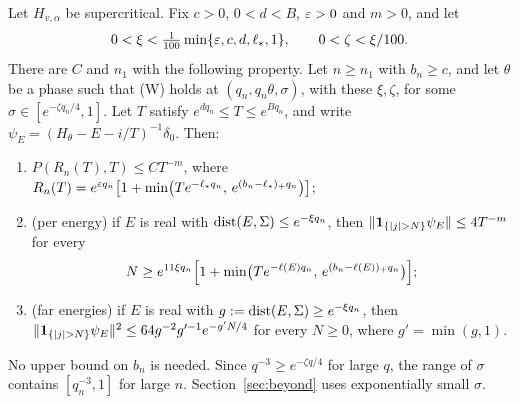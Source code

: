 \begin{theorem}\label{thm:tI-window}
Let $H_{v,\alpha}$ be supercritical. Fix $c>0$, $0<d<B$, $\varepsilon>0$ and $m>0$, and let
\[
0<\xi<\tfrac1{100}\min\{\varepsilon,c,d,\ell_*,1\},\qquad0<\zeta<\xi/100.
\]
There are $C$ and $n_1$ with the following property. Let $n\ge n_1$ with $b_n\ge c$, and let $\theta$ be a phase such that (W) holds at $(q_n,q_n\theta,\sigma)$, with these $\xi,\zeta$, for some $\sigma\in[e^{-\zeta q_n/4},1]$. Let $T$ satisfy $e^{dq_n}\le T\le e^{Bq_n}$, and write $\psi_E=(H_\theta-E-i/T)^{-1}\delta_0$. Then:
\begin{enumerate}
\item $P(R_n(T),T)\le CT^{-m}$, where $R_n(T)=e^{\varepsilon q_n}\bigl[1+\min\bigl(Te^{-\ell_*q_n},\,e^{(b_n-\ell_*)_+q_n}\bigr)\bigr]$;
\item (per energy) if $E$ is real with $\operatorname{dist}(E,\Sigma)\le e^{-\xi q_n}$, then $\|\un_{\{|j|>N\}}\psi_E\|\le4T^{-m}$ for every
\[
N\ge e^{11\xi q_n}\Bigl[1+\min\bigl(Te^{-\ell(E)q_n},\,e^{(b_n-\ell(E))_+q_n}\bigr)\Bigr];
\]
\item (far energies) if $E$ is real with $g:=\operatorname{dist}(E,\Sigma)\ge e^{-\xi q_n}$, then $\|\un_{\{|j|>N\}}\psi_E\|^2\le64g^{-2}g'^{-1}e^{-g'N/4}$ for every $N\ge0$, where $g'=\min(g,1)$.
\end{enumerate}
\end{theorem}

No upper bound on $b_n$ is needed. Since $q^{-3}\ge e^{-\zeta q/4}$ for large $q$, the range of $\sigma$ contains $[q_n^{-3},1]$ for large $n$. Section~\ref{sec:beyond} uses exponentially small $\sigma$.

